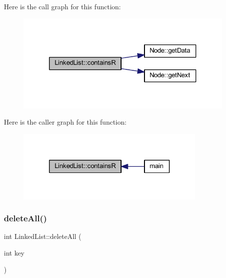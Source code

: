 Here is the call graph for this function\+:
\nopagebreak
\begin{figure}[H]
\begin{center}
\leavevmode
\includegraphics[width=305pt]{class_linked_list_a67c86ff482738c1ab36bb8c764a7f3f7_cgraph}
\end{center}
\end{figure}
Here is the caller graph for this function\+:
\nopagebreak
\begin{figure}[H]
\begin{center}
\leavevmode
\includegraphics[width=264pt]{class_linked_list_a67c86ff482738c1ab36bb8c764a7f3f7_icgraph}
\end{center}
\end{figure}
\mbox{\label{class_linked_list_a8b00d7145aa7ee83ba2e49623285e371}} 
\subsubsection{\texorpdfstring{delete\+All()}{deleteAll()}}
{\footnotesize\ttfamily int Linked\+List\+::delete\+All (\begin{DoxyParamCaption}\item[{int}]{key }\end{DoxyParamCaption})}


